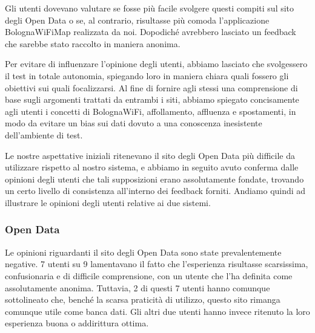 Gli utenti dovevano valutare se fosse più facile svolgere questi compiti sul sito degli Open Data o se, al contrario, risultasse più comoda l'applicazione BolognaWiFiMap realizzata da noi. Dopodiché avrebbero lasciato un feedback che sarebbe stato raccolto in maniera anonima.

Per evitare di influenzare l'opinione degli utenti, abbiamo lasciato che svolgessero il test in totale autonomia, spiegando loro in maniera chiara quali fossero gli obiettivi sui quali focalizzarsi. Al fine di fornire agli stessi una comprensione di base sugli argomenti trattati da entrambi i siti, abbiamo spiegato concisamente agli utenti i concetti di BolognaWiFi, affollamento, affluenza e spostamenti, in modo da evitare un bias sui dati dovuto a una conoscenza inesistente dell'ambiente di test.

Le nostre aspettative iniziali ritenevano il sito degli Open Data più difficile da utilizzare rispetto al nostro sistema, e abbiamo in seguito avuto conferma dalle opinioni degli utenti che tali supposizioni erano assolutamente fondate, trovando un certo livello di consistenza all'interno dei feedback forniti. Andiamo quindi ad illustrare le opinioni degli utenti relative ai due sistemi.

\subsubsection{Open Data}
Le opinioni riguardanti il sito degli Open Data sono state prevalentemente negative. 7 utenti su 9 lamentavano il fatto che l'esperienza risultasse scarsissima, confusionaria e di difficile comprensione, con un utente che l'ha definita come assolutamente anonima. Tuttavia, 2 di questi 7 utenti hanno comunque sottolineato che, benché la scarsa praticità di utilizzo, questo sito rimanga comunque utile come banca dati. Gli altri due utenti hanno invece ritenuto la loro esperienza buona o addirittura ottima.

